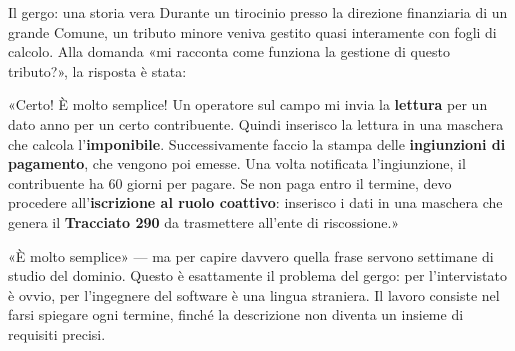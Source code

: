 \begin{center}
\end{center}


\begin{esempio}{Il gergo: una storia vera}
Durante un tirocinio presso la direzione finanziaria di un grande Comune, un tributo minore veniva gestito quasi interamente
con fogli di calcolo. Alla domanda «mi racconta come funziona la gestione di questo tributo?», la risposta è stata:

\begin{center}
\begin{tcolorbox}[enhanced, breakable=false, colback=swteal!8, colframe=swteal, boxrule=0.8pt, arc=3pt, width=0.95\linewidth, fontupper=\itshape\small]
  «Certo! È molto semplice! Un operatore sul campo mi invia la \textbf{lettura} per un dato anno per un certo contribuente.
  Quindi inserisco la lettura in una maschera che calcola l'\textbf{imponibile}. Successivamente faccio la stampa delle
  \textbf{ingiunzioni di pagamento}, che vengono poi emesse. Una volta notificata l'ingiunzione, il contribuente ha 60 giorni
  per pagare. Se non paga entro il termine, devo procedere all'\textbf{iscrizione al ruolo coattivo}: inserisco i dati in una
  maschera che genera il \textbf{Tracciato 290} da trasmettere all'ente di riscossione.»
\end{tcolorbox}
\end{center}

«È molto semplice» --- ma per capire davvero quella frase servono settimane di studio del dominio. Questo è esattamente il
problema del gergo: per l'intervistato è ovvio, per l'ingegnere del software è una lingua straniera. Il lavoro consiste nel
farsi spiegare ogni termine, finché la descrizione non diventa un insieme di requisiti precisi.
\end{esempio}

